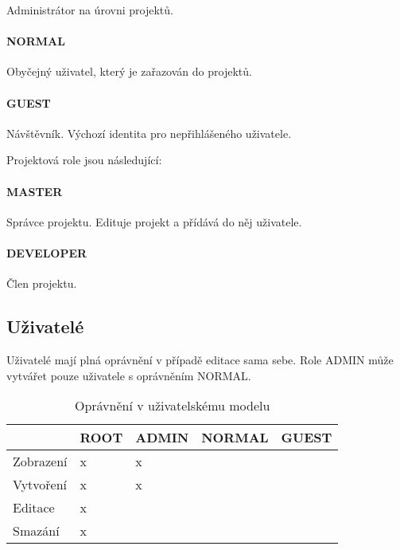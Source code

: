 Administrátor na úrovni projektů.

\paragraph{NORMAL}

Obyčejný uživatel, který je zařazován do projektů.

\paragraph{GUEST}

Návštěvník.
Výchozí identita pro nepřihlášeného uživatele.

\noindent\makebox[\linewidth]{\rule{\textwidth}{0.4pt}}

Projektová role jsou následující:

\paragraph{MASTER}

Správce projektu.
Edituje projekt a přídává do něj uživatele.

\paragraph{DEVELOPER}

Člen projektu.

\noindent\makebox[\linewidth]{\rule{\textwidth}{0.4pt}}

\subsection{Uživatelé}

Uživatelé mají plná oprávnění v případě editace sama sebe.
Role ADMIN může vytvářet pouze uživatele s oprávněním NORMAL.

\begin{table}[h]
\centering
\caption{Oprávnění v uživatelskému modelu}
\begin{tabular}{|l|l|l|l|l|}
\hline
       & ROOT & ADMIN & NORMAL & GUEST \\ \hline
Zobrazení   & x    & x     &        &       \\ \hline
Vytvoření & x    & x     &        &       \\ \hline
Editace   & x    &       &        &       \\ \hline
Smazání & x    &       &        &       \\ \hline
\end{tabular}
\end{table}

